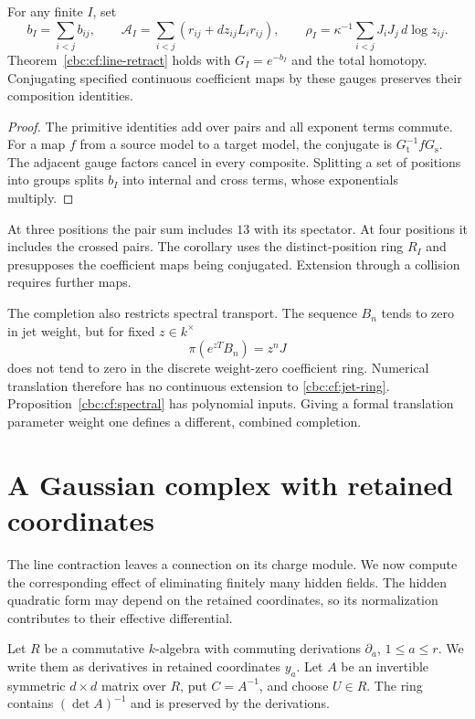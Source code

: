 \begin{corollary}\label{cbc:cf:all-positions}
For any finite $I$, set
\[
 b_I=\sum_{i<j}b_{ij},\qquad
 \mathcal A_I=\sum_{i<j}(r_{ij}+dz_{ij}L_ir_{ij}),\qquad
 \rho_I=\kappa^{-1}\sum_{i<j}J_iJ_j\,d\log z_{ij}.
\]
Theorem~\ref{cbc:cf:line-retract} holds with
$G_I=e^{-b_I}$ and the total homotopy.
Conjugating specified continuous coefficient maps by these
gauges preserves their composition identities.
\end{corollary}
\begin{proof}
The primitive identities add over pairs and all exponent terms
commute. For a map $f$ from a source model to a target model,
the conjugate is $G_{\mathrm t}^{-1}fG_{\mathrm s}$.
The adjacent gauge factors cancel in every composite.
Splitting a set of positions into groups splits $b_I$ into
internal and cross terms, whose exponentials multiply.
\end{proof}

At three positions the pair sum includes $13$ with its spectator.
At four positions it includes the crossed pairs. The corollary
uses the distinct-position ring $R_I$ and presupposes the
coefficient maps being conjugated. Extension through a collision
requires further maps.

The completion also restricts spectral transport. The sequence
$B_n$ tends to zero in jet weight, but for fixed $z\in k^\times$
\[
 \pi(e^{zT}B_n)=z^nJ
\]
does not tend to zero in the discrete weight-zero coefficient
ring. Numerical translation therefore has no continuous extension
to \eqref{cbc:cf:jet-ring}. Proposition~\ref{cbc:cf:spectral}
has polynomial inputs. Giving a formal translation parameter
weight one defines a different, combined completion.

\section{A Gaussian complex with retained coordinates}
\label{cbc:cf:gaussian}

The line contraction leaves a connection on its charge module.
We now compute the corresponding effect of eliminating finitely
many hidden fields. The hidden quadratic form may depend on the
retained coordinates, so its normalization contributes to their
effective differential.

Let $R$ be a commutative $k$-algebra with commuting derivations
$\partial_a$, $1\leq a\leq r$. We write them as derivatives
in retained coordinates $y_a$. Let $A$ be an invertible symmetric
$d\times d$ matrix over $R$, put $C=A^{-1}$, and choose $U\in R$.
The ring contains $(\det A)^{-1}$ and is preserved by the
derivations.

